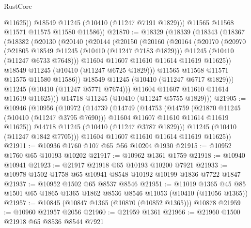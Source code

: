 \begin{lexlean}{RustCore}
\begin{coremodule}
              @11625))
          @18549
          @11245
          (@10410 (@11247 @7191 @1829)))
        @11565
        @11568
        @11571
        @11575
        @11580
        @11586))
@21870 := @18329
    (@18339
      (@18343
        (@18367
          (@18382
            (@20130
              (@20140
                (@20144
                  (@20150
                    (@20160
                      (@20164
                        (@20170
                          (@20970
                            (@21805 @18549 @11245 (@10410 (@11247 @7183 @1829)))
                            @11245
                            (@10410 (@11247 @6733 @7648)))
                          @11604
                          @11607
                          @11610
                          @11614
                          @11619
                          @11625))
                      @18549
                      @11245
                      (@10410 (@11247 @6725 @1829)))
                    @11565
                    @11568
                    @11571
                    @11575
                    @11580
                    @11586))
                @18549
                @11245
                (@10410 (@11247 @6717 @1829)))
              @11245
              (@10410 (@11247 @5771 @7674)))
            @11604
            @11607
            @11610
            @11614
            @11619
            @11625)))
      @14718
      @11245
      (@10410 (@11247 @5755 @1829)))
@21905 := @10946
    (@10956
      (@10972
        (@14739
          (@14749
            (@14753
              (@14759
                (@21870 @11245 (@10410 (@11247 @3795 @7690)))
                @11604
                @11607
                @11610
                @11614
                @11619
                @11625))
            @14718
            @11245
            (@10410 (@11247 @3787 @1829)))
          @11245
          (@10410 (@11247 @1842 @7705)))
        @11604
        @11607
        @11610
        @11614
        @11619
        @11625))
@21911 := @10936 @1760 @107 @65 @56 @10204 @1930
@21915 := @10952 @1760 @65 @10193 @10202
@21917 := @10962 @1361 @1759
@21918 := @10940 @10941
@21923 := @21917 @21918 @65 @10193 @10200 @7921
@21933 := @10978 @1502 @1758 @65 @10941 @8548 @10192 @10199 @1836 @7722 @1847
@21937 := @10952 @1502 @65 @8537 @8546
@21951 := @11019
    @1365
    @45
    @85
    @1501
    @65
    @1865
    @1365
    @1862
    @8536
    @8546
    @11053
    (@10410 (@11056 @1365))
@21957 := @10845 (@10847 @1365 (@10870 (@10852 @1365))) @10878
@21959 := @10960 @21957 @2056
@21960 := @21959 @1361
@21966 := @21960 @1500 @21918 @65 @8536 @8544 @7921

\end{coremodule}
\end{lexlean}
